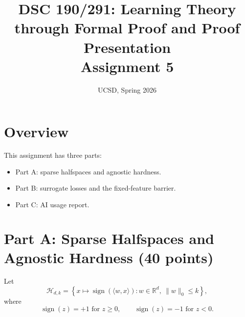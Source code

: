 \documentclass{article}
\title{DSC 190/291: Learning Theory through Formal Proof and Proof Presentation\\Assignment 5}
\date{UCSD, Spring 2026}
\begin{document}
\maketitle

\section{Overview}

This assignment has three parts:
\begin{itemize}
\item Part A: sparse halfspaces and agnostic hardness.
\item Part B: surrogate losses and the fixed-feature barrier.
\item Part C: AI usage report.
\end{itemize}

\section{Part A: Sparse Halfspaces and Agnostic Hardness (40 points)}

Let
$$
\mathcal{H}_{d,k}
=
\left\{
x \mapsto \operatorname{sign}(\langle w,x\rangle)
:
w \in \mathbb{R}^d,\ \|w\|_0 \le k
\right\},
$$
where
$$
\operatorname{sign}(z)=+1 \text{ for } z\ge 0,
\qquad
\operatorname{sign}(z)=-1 \text{ for } z<0.
$$
\end{document}

